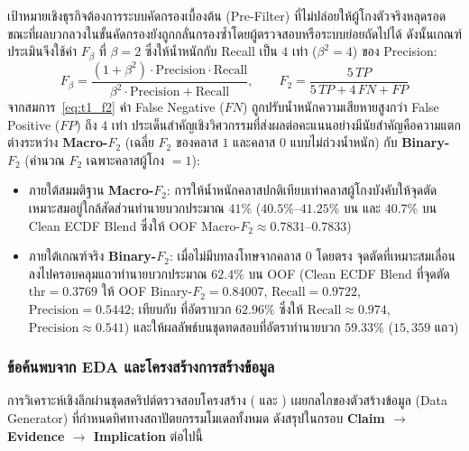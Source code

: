 เป้าหมายเชิงธุรกิจต้องการระบบคัดกรองเบื้องต้น (Pre-Filter) ที่ไม่ปล่อยให้ผู้โกงตัวจริงหลุดรอด ขณะที่ผลบวกลวงในขั้นคัดกรองยังถูกกลั่นกรองซ้ำโดยผู้ตรวจสอบหรือระบบย่อยถัดไปได้ ดังนั้นเกณฑ์ประเมินจึงใช้ค่า $F_\beta$ ที่ $\beta = 2$ ซึ่งให้น้ำหนักกับ Recall เป็น $4$ เท่า ($\beta^2 = 4$) ของ Precision:
\begin{equation}
F_\beta = \frac{(1+\beta^2)\cdot \text{Precision}\cdot \text{Recall}}{\beta^2\cdot \text{Precision}+\text{Recall}}, \qquad
F_2 = \frac{5\,TP}{5\,TP + 4\,FN + FP}
\label{eq:t1_f2}
\end{equation}
จากสมการ~\eqref{eq:t1_f2} ค่า False Negative ($FN$) ถูกปรับน้ำหนักความเสียหายสูงกว่า False Positive ($FP$) ถึง $4$ เท่า ประเด็นสำคัญเชิงวิศวกรรมที่ส่งผลต่อคะแนนอย่างมีนัยสำคัญคือความแตกต่างระหว่าง \textbf{Macro-$F_2$} (เฉลี่ย $F_2$ ของคลาส $1$ และคลาส $0$ แบบไม่ถ่วงน้ำหนัก) กับ \textbf{Binary-$F_2$} (คำนวณ $F_2$ เฉพาะคลาสผู้โกง  $= 1$):
\begin{itemize}
  \item ภายใต้สมมติฐาน \textbf{Macro-$F_2$}: การให้น้ำหนักคลาสปกติเทียบเท่าคลาสผู้โกงบังคับให้จุดตัดเหมาะสมอยู่ใกล้สัดส่วนทำนายบวกประมาณ $41\%$ ($40.5\%$--$41.25\%$ บน  และ $40.7\%$ บน Clean ECDF Blend ซึ่งให้ OOF Macro-$F_2 \approx 0.7831$--$0.7833$)
  \item ภายใต้เกณฑ์จริง \textbf{Binary-$F_2$}: เมื่อไม่มีบทลงโทษจากคลาส $0$ โดยตรง จุดตัดที่เหมาะสมเลื่อนลงไปครอบคลุมแถวทำนายบวกประมาณ $62.4\%$ บน OOF (Clean ECDF Blend ที่จุดตัด $\text{thr} = 0.3769$ ให้ OOF Binary-$F_2 = 0.84007$, $\text{Recall} = 0.9722$, $\text{Precision} = 0.5442$; เทียบกับ  ที่อัตราบวก $62.96\%$ ซึ่งให้ $\text{Recall} \approx 0.974$, $\text{Precision} \approx 0.541$) และให้ผลลัพธ์บนชุดทดสอบที่อัตราทำนายบวก $59.33\%$ ($15,359$ แถว)
\end{itemize}

\subsubsection{ข้อค้นพบจาก EDA และโครงสร้างการสร้างข้อมูล}

การวิเคราะห์เชิงลึกผ่านชุดสคริปต์ตรวจสอบโครงสร้าง ( และ ) เผยกลไกของตัวสร้างข้อมูล (Data Generator) ที่กำหนดทิศทางสถาปัตยกรรมโมเดลทั้งหมด ดังสรุปในกรอบ \textbf{Claim $\rightarrow$ Evidence $\rightarrow$ Implication} ต่อไปนี้

